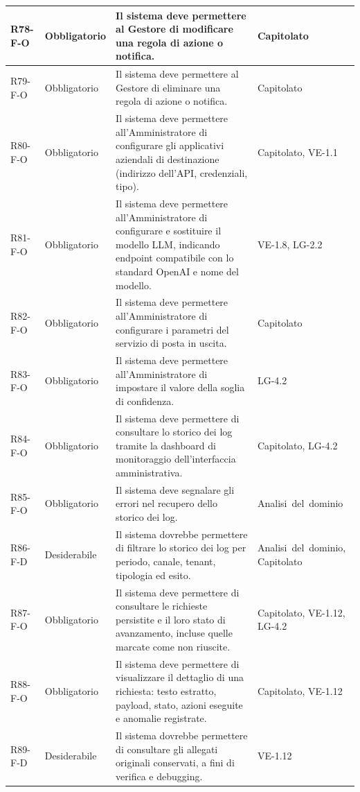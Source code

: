 {\begin{longtable}{|>{\raggedright\arraybackslash}p{1.8cm}|>{\raggedright\arraybackslash}p{2.3cm}|>{\raggedright\arraybackslash}p{6.6cm}|>{\raggedright\arraybackslash}p{3.1cm}|}
    \mbox{R78-F-O} & Obbligatorio & Il sistema deve permettere al Gestore di modificare una regola di azione o notifica. & \mbox{Capitolato} \\ \hline
    \mbox{R79-F-O} & Obbligatorio & Il sistema deve permettere al Gestore di eliminare una regola di azione o notifica. & \mbox{Capitolato} \\ \hline
    \mbox{R80-F-O} & Obbligatorio & Il sistema deve permettere all'Amministratore di configurare gli applicativi aziendali di destinazione (indirizzo dell'API, credenziali, tipo). & \mbox{Capitolato}, \mbox{VE-1.1} \\ \hline
    \mbox{R81-F-O} & Obbligatorio & Il sistema deve permettere all'Amministratore di configurare e sostituire il modello LLM, indicando endpoint compatibile con lo standard OpenAI e nome del modello. & \mbox{VE-1.8}, \mbox{LG-2.2} \\ \hline
    \mbox{R82-F-O} & Obbligatorio & Il sistema deve permettere all'Amministratore di configurare i parametri del servizio di posta in uscita. & \mbox{Capitolato} \\ \hline
    \mbox{R83-F-O} & Obbligatorio & Il sistema deve permettere all'Amministratore di impostare il valore della soglia di confidenza. & \mbox{LG-4.2} \\ \hline
    \mbox{R84-F-O} & Obbligatorio & Il sistema deve permettere di consultare lo storico dei log tramite la dashboard di monitoraggio dell'interfaccia amministrativa. & \mbox{Capitolato}, \mbox{LG-4.2} \\ \hline
    \mbox{R85-F-O} & Obbligatorio & Il sistema deve segnalare gli errori nel recupero dello storico dei log. & \mbox{Analisi del dominio} \\ \hline
    \mbox{R86-F-D} & Desiderabile & Il sistema dovrebbe permettere di filtrare lo storico dei log per periodo, canale, tenant, tipologia ed esito. & \mbox{Analisi del dominio}, \mbox{Capitolato} \\ \hline
    \mbox{R87-F-O} & Obbligatorio & Il sistema deve permettere di consultare le richieste persistite e il loro stato di avanzamento, incluse quelle marcate come non riuscite. & \mbox{Capitolato}, \mbox{VE-1.12}, \mbox{LG-4.2} \\ \hline
    \mbox{R88-F-O} & Obbligatorio & Il sistema deve permettere di visualizzare il dettaglio di una richiesta: testo estratto, payload, stato, azioni eseguite e anomalie registrate. & \mbox{Capitolato}, \mbox{VE-1.12} \\ \hline
    \mbox{R89-F-D} & Desiderabile & Il sistema dovrebbe permettere di consultare gli allegati originali conservati, a fini di verifica e debugging. & \mbox{VE-1.12} \\ \hline

\end{longtable}}

